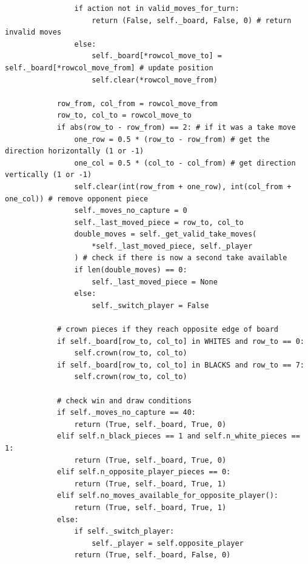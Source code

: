 \documentclass{article}
\begin{document}
\begin{verbatim}
                if action not in valid_moves_for_turn:
                    return (False, self._board, False, 0) # return invalid moves
                else:
                    self._board[*rowcol_move_to] = self._board[*rowcol_move_from] # update position
                    self.clear(*rowcol_move_from)

            row_from, col_from = rowcol_move_from
            row_to, col_to = rowcol_move_to
            if abs(row_to - row_from) == 2: # if it was a take move
                one_row = 0.5 * (row_to - row_from) # get the direction horizontally (1 or -1)
                one_col = 0.5 * (col_to - col_from) # get direction vertically (1 or -1)
                self.clear(int(row_from + one_row), int(col_from + one_col)) # remove opponent piece
                self._moves_no_capture = 0 
                self._last_moved_piece = row_to, col_to
                double_moves = self._get_valid_take_moves(
                    *self._last_moved_piece, self._player
                ) # check if there is now a second take available
                if len(double_moves) == 0:
                    self._last_moved_piece = None
                else:
                    self._switch_player = False 

            # crown pieces if they reach opposite edge of board
            if self._board[row_to, col_to] in WHITES and row_to == 0:
                self.crown(row_to, col_to)
            if self._board[row_to, col_to] in BLACKS and row_to == 7:
                self.crown(row_to, col_to) 

            # check win and draw conditions
            if self._moves_no_capture == 40:
                return (True, self._board, True, 0)
            elif self.n_black_pieces == 1 and self.n_white_pieces == 1:
                return (True, self._board, True, 0)
            elif self.n_opposite_player_pieces == 0:
                return (True, self._board, True, 1)
            elif self.no_moves_available_for_opposite_player():
                return (True, self._board, True, 1)
            else:
                if self._switch_player:
                    self._player = self.opposite_player
                return (True, self._board, False, 0)

    
    \end{verbatim}
\end{document}
